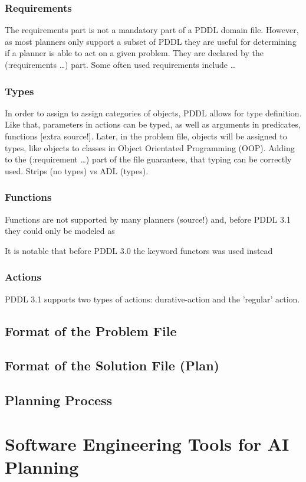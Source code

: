 \documentclass[11pt]{article}
\begin{document}
\subsubsection{Requirements}
\label{sec-3-1-2}
The requirements part is not a mandatory part of a PDDL domain file.
However, as most planners only support a subset of PDDL they are
useful for determining if a planner is able to act on a given problem.
They are declared by the (:requirements \ldots{}) part. Some often used
requirements include \ldots{}
\subsubsection{Types}
\label{sec-3-1-3}
In order to assign to assign categories of objects, PDDL allows for
type definition. Like that, parameters in actions can be typed, as
well as arguments in predicates, functions [extra source!]. Later, in
the problem file, objects will be assigned to types, like objects to
classes in Object Orientated Programming (OOP). Adding to the
(:requirement \ldots{}) part of the file guarantees, that typing can be
correctly used. Strips (no types) vs ADL (types).
\subsubsection{Functions}
\label{sec-3-1-4}
Functions are not supported by many planners (source!) and, before
PDDL 3.1 they could only be modeled as 

It is notable that before PDDL 3.0 the keyword functors was used instead
\subsubsection{Actions}
\label{sec-3-1-5}
PDDL 3.1 supports two types of actions: durative-action and the
'regular' action.
\subsection{Format of the Problem File}
\label{sec-3-2}
\subsection{Format of the Solution File (Plan)}
\label{sec-3-3}
\subsection{Planning Process}
\label{sec-3-4}
\section{Software Engineering Tools for AI Planning}
\label{sec-4}
\end{document}
